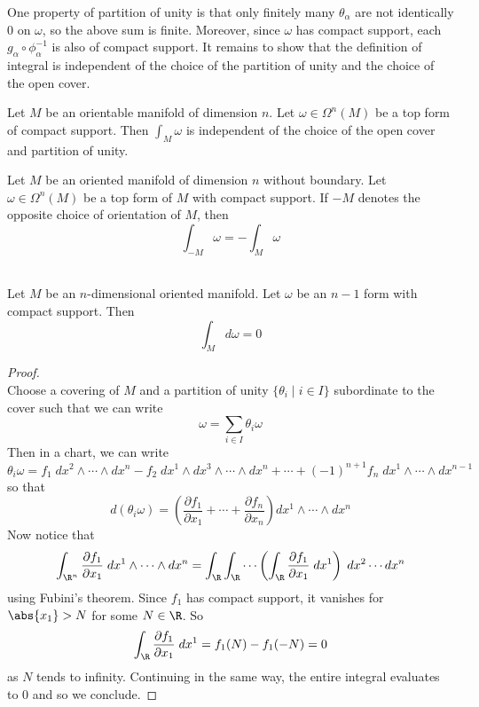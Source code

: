 \documentclass[a4paper]{article}
\begin{document}
One property of partition of unity is that only finitely many $\theta_\alpha$ are not identically $0$ on $\omega$, so the above sum is finite. Moreover, since $\omega$ has compact support, each $g_\alpha\circ\phi_\alpha^{-1}$ is also of compact support. It remains to show that the definition of integral is independent of the choice of the partition of unity and the choice of the open cover. 

\begin{prp}{}{} Let $M$ be an orientable manifold of dimension $n$. Let $\omega\in\Omega^n(M)$ be a top form of compact support. Then $\int_M\omega$ is independent of the choice of the open cover and partition of unity. 
\end{prp}

\begin{prp}{}{} Let $M$ be an oriented manifold of dimension $n$ without boundary. Let $\omega\in\Omega^n(M)$ be a top form of $M$ with compact support. If $-M$ denotes the opposite choice of orientation of $M$, then $$\int_{-M}\omega=-\int_M\omega$$
\end{prp}

\begin{prp}{}{}\\
Let $M$ be an $n$-dimensional oriented manifold. Let $\omega$ be an $n-1$ form with compact support. Then $$\int_Md\omega=0$$ 
\begin{proof}\\
Choose a covering of $M$ and a partition of unity $\{\theta_i\;|\;i\in I\}$ subordinate to the cover such that we can write $$\omega=\sum_{i\in I}\theta_i\omega$$ Then in a chart, we can write $$\theta_i\omega=f_1\;dx^2\wedge\cdots\wedge dx^n-f_2\;dx^1\wedge dx^3\wedge\cdots\wedge dx^n+\cdots+(-1)^{n+1}f_n\;dx^1\wedge\cdots\wedge dx^{n-1}$$ so that $$d(\theta_i\omega)=\left(\frac{\partial f_1}{\partial x_1}+\cdots+\frac{\partial f_n}{\partial x_n}\right)dx^1\wedge\cdots\wedge dx^n$$ Now notice that $$\int_{\R^n}\frac{\partial f_1}{\partial x_1}\;dx^1\wedge\cdots\wedge dx^n=\int_\R\int_\R\cdots\left(\int_\R\frac{\partial f_1}{\partial x_1}\;dx^1\right)\;dx^2\cdots dx^n$$ using Fubini's theorem. Since $f_1$ has compact support, it vanishes for $\abs{x_1}>N$ for some $N\in\R$. So $$\int_\R\frac{\partial f_1}{\partial x_1}\;dx^1=f_1(N)-f_1(-N)=0$$ as $N$ tends to infinity. Continuing in the same way, the entire integral evaluates to $0$ and so we conclude. 
\end{proof}
\end{prp}
\end{document}

